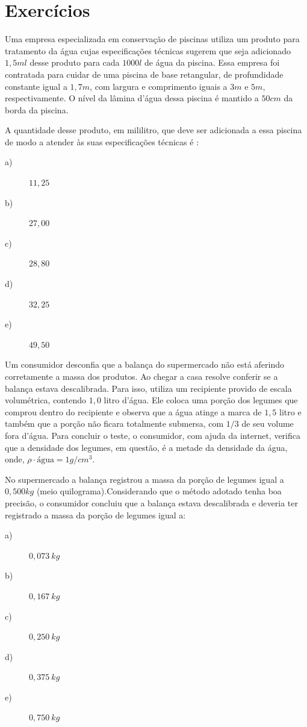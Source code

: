 \section{Exercícios}

\begin{exercise}[ENEM 2017]
	Uma empresa especializada em conservação de piscinas utiliza um produto para tratamento da água cujas especificações técnicas sugerem que seja adicionado $1,5 ml$ desse produto para cada $1000 l$ de água da piscina. Essa empresa foi contratada para cuidar de uma piscina de base retangular, de profundidade constante igual a $1,7 m$, com largura e comprimento iguais a $3 m$ e $5 m$, respectivamente. O nível da lâmina d’água dessa piscina é mantido a $50 cm$ da borda da piscina.

A quantidade desse produto, em mililitro, que deve ser adicionada a essa piscina de modo a atender às suas especificações técnicas é :
    \begin{description}
        \item[a)] $11,25$
        \item[b)] $27,00$
        \item[c)] $28,80$
        \item[d)] $32,25$
        \item[e)] $49,50$
    \end{description}
\end{exercise}

\begin{exercise}[ENEM 2010]
Um consumidor desconfia que a balança do supermercado não está aferindo corretamente a massa dos produtos. Ao chegar a casa resolve conferir se a balança estava descalibrada. Para isso, utiliza um recipiente provido de escala volumétrica, contendo $1,0$ litro d’água. Ele coloca uma porção dos legumes que comprou dentro do recipiente e observa que a água atinge a marca de $1,5$ litro e também que a porção não ficara totalmente submersa, com $1/3$ de seu volume fora d’água. Para concluir o teste, o consumidor, com ajuda da internet, verifica que a  densidade dos legumes, em questão, é a metade da densidade da água, onde, $ \rho \cdot \textrm{água} = 1 g/cm^{3}$.

No supermercado a balança registrou a massa da porção de legumes igual a $0,500 kg$ (meio quilograma).Considerando que o método adotado tenha boa precisão, o consumidor concluiu que a balança estava descalibrada e deveria ter registrado a massa da porção de legumes igual a:

    \begin{description}
        \item[a)] $0,073~kg$
        \item[b)] $0,167~kg$
        \item[c)] $0,250~kg$
        \item[d)] $0,375~kg$
        \item[e)] $0,750~kg$
    \end{description}
\end{exercise}


